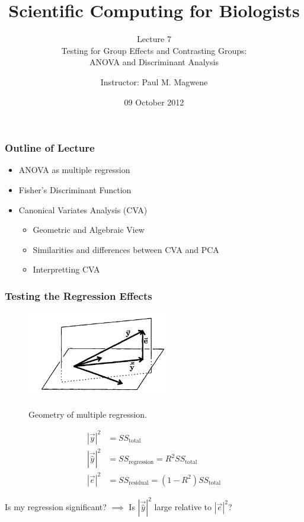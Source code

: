 \documentclass{beamer}
\title{Scientific Computing for Biologists}
\subtitle{Lecture 7 \\
        Testing for Group Effects and Contrasting Groups:\\
         ANOVA and Discriminant Analysis}
\author{Instructor: Paul M. Magwene}
\date{09 October 2012}
\begin{document}
\begin{frame}
\titlepage
\end{frame}


\begin{frame}
  \frametitle{Outline of Lecture}

\begin{itemize}
    \item ANOVA as multiple regression
    \item Fisher's Discriminant Function
    \item Canonical Variates Analysis (CVA)
    \begin{itemize}
        \item Geometric and Algebraic View
        \item Similarities and differences between CVA and PCA
        \item Interpretting CVA
    \end{itemize}

\end{itemize}

\end{frame}



\begin{frame}[fragile]
  \frametitle{Testing the Regression Effects}

\begin{figure}
{\centering \includegraphics[height=1.5in]{fig-multireg.pdf}}
\caption{Geometry of multiple regression.}
\end{figure}
%
\begin{align*}
|\vec{y}|^2 &= SS_{\text{total}} \\
|\vec{\hat{y}}|^2 &= SS_{\text{regression}} = R^2 SS_{\text{total}}\\
|\vec{e}|^2 &= SS_{\text{residual}}  = (1-R^2)SS_{\text{total}}
\end{align*}
%
\begin{center}
\alert{Is my regression significant? $\implies$ Is $|\vec{\hat{y}}|^2$ large relative to $|\vec{e}|^2$?}
\end{center}

\end{frame}
\end{document}
